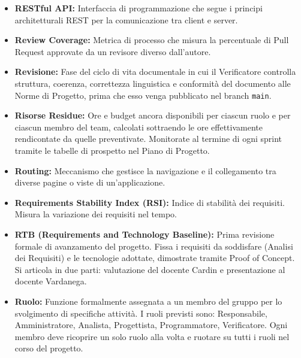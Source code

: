 \begin{itemize}[leftmargin=*]
      \item \textbf{RESTful API:} Interfaccia di programmazione che segue i principi architetturali REST per la comunicazione tra client e server.
      \item \textbf{Review Coverage:} Metrica di processo che misura la percentuale di Pull Request approvate da un revisore diverso dall'autore.
      \item \textbf{Revisione:} Fase del ciclo di vita documentale in cui il
          Verificatore controlla struttura, coerenza, correttezza linguistica e
          conformità del documento alle Norme di Progetto, prima che esso venga
          pubblicato nel branch \texttt{main}.
      \item \textbf{Risorse Residue:} Ore e budget ancora disponibili per ciascun ruolo
      e per ciascun membro del team, calcolati sottraendo le ore effettivamente
      rendicontate da quelle preventivate. Monitorate al termine di ogni sprint
      tramite le tabelle di prospetto nel Piano di Progetto.
      \item \textbf{Routing:} Meccanismo che gestisce la navigazione e il collegamento tra diverse pagine o viste di un’applicazione.
      \item \textbf{Requirements Stability Index (RSI):} Indice di stabilità dei requisiti. 
      Misura la variazione dei requisiti nel tempo.
      \item \textbf{RTB (Requirements and Technology Baseline):} Prima revisione
          formale di avanzamento del progetto. Fissa i requisiti da soddisfare
          (Analisi dei Requisiti) e le tecnologie adottate, dimostrate tramite
          Proof of Concept. Si articola in due parti: valutazione del docente
          Cardin e presentazione al docente Vardanega.
      \item \textbf{Ruolo:} Funzione formalmente assegnata a un membro del gruppo
          per lo svolgimento di specifiche attività. I ruoli previsti sono:
          Responsabile, Amministratore, Analista, Progettista, Programmatore,
          Verificatore. Ogni membro deve ricoprire un solo ruolo alla volta e
          ruotare su tutti i ruoli nel corso del progetto.
\end{itemize}
 
{}
